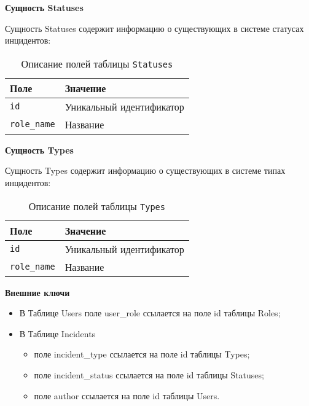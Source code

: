 \noindent\textbf{Сущность Statuses}

Сущность Statuses содержит информацию о существующих в системе статусах инцидентов:
\begin{table}[!ht]
	\caption{Описание полей таблицы \texttt{Statuses}}
	\label{tbl:statuses}
	\begin{center}
		\begin{tabular}{|p{}p{}|}
			\hline
			\textbf{Поле} & \textbf{Значение} \\\hline
			\texttt{id} & Уникальный идентификатор \\\hline
			\texttt{role\_name} & Название \\\hline
		\end{tabular}
	\end{center}
\end{table}

\noindent\textbf{Сущность Types}

Сущность Types содержит информацию о существующих в системе типах инцидентов:
\begin{table}[!ht]
	\caption{Описание полей таблицы \texttt{Types}}
	\label{tbl:types}
	\begin{center}
		\begin{tabular}{|p{}p{}|}
			\hline
			\textbf{Поле} & \textbf{Значение} \\\hline
			\texttt{id} & Уникальный идентификатор \\\hline
			\texttt{role\_name} & Название \\\hline
		\end{tabular}
	\end{center}
\end{table}

\newpage
\noindent\textbf{Внешние ключи}

\begin{itemize}
\item В Таблице Users поле user\_role ссылается на поле id таблицы Roles;
\item В Таблице Incidents 
	\begin{itemize}
		\item поле incident\_type ссылается на поле id таблицы Types;
		\item поле incident\_status ссылается на поле id таблицы Statuses;
		\item поле author ссылается на поле id таблицы Users.
	\end{itemize}
\end{itemize}

